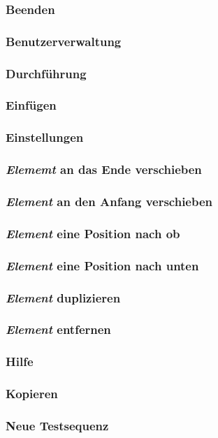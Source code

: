 \documentclass[a4paper,10pt]{scrartcl}
\begin{document}
\subsubsection{Beenden}
\subsubsection{Benutzerverwaltung}
\subsubsection{Durchführung}
\subsubsection{Einfügen}
\subsubsection{Einstellungen}
\subsubsection{\textit{Elememt} an das Ende verschieben}
\subsubsection{\textit{Element} an den Anfang verschieben}
\subsubsection{\textit{Element} eine Position nach ob}
\subsubsection{\textit{Element} eine Position nach unten}
\subsubsection{\textit{Element} duplizieren}
\subsubsection{\textit{Element} entfernen}
\subsubsection{Hilfe}
\subsubsection{Kopieren}
\subsubsection{Neue Testsequenz}
\end{document}
